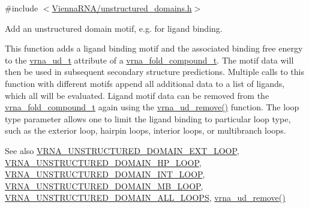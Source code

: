 {\ttfamily \#include $<$\hyperlink{unstructured__domains_8h}{Vienna\+R\+N\+A/unstructured\+\_\+domains.\+h}$>$}



Add an unstructured domain motif, e.\+g. for ligand binding. 

This function adds a ligand binding motif and the associated binding free energy to the \hyperlink{group__domains__up_ga0009117b14d29143e8b18ab891f48c2d}{vrna\+\_\+ud\+\_\+t} attribute of a \hyperlink{group__fold__compound_ga1b0cef17fd40466cef5968eaeeff6166}{vrna\+\_\+fold\+\_\+compound\+\_\+t}. The motif data will then be used in subsequent secondary structure predictions. Multiple calls to this function with different motifs append all additional data to a list of ligands, which all will be evaluated. Ligand motif data can be removed from the \hyperlink{group__fold__compound_ga1b0cef17fd40466cef5968eaeeff6166}{vrna\+\_\+fold\+\_\+compound\+\_\+t} again using the \hyperlink{group__domains__up_gada59cb0c498b812eadd010811af3f2d4}{vrna\+\_\+ud\+\_\+remove()} function. The loop type parameter allows one to limit the ligand binding to particular loop type, such as the exterior loop, hairpin loops, interior loops, or multibranch loops.

\begin{DoxySeeAlso}{See also}
\hyperlink{group__domains__up_gaac911374e86236a51bfd42e1f098eaba}{V\+R\+N\+A\+\_\+\+U\+N\+S\+T\+R\+U\+C\+T\+U\+R\+E\+D\+\_\+\+D\+O\+M\+A\+I\+N\+\_\+\+E\+X\+T\+\_\+\+L\+O\+OP}, \hyperlink{group__domains__up_ga23b610ea9564346c45cc1e2bbb62adf7}{V\+R\+N\+A\+\_\+\+U\+N\+S\+T\+R\+U\+C\+T\+U\+R\+E\+D\+\_\+\+D\+O\+M\+A\+I\+N\+\_\+\+H\+P\+\_\+\+L\+O\+OP}, \hyperlink{group__domains__up_gac4a0feccd9654c149203200248c2716b}{V\+R\+N\+A\+\_\+\+U\+N\+S\+T\+R\+U\+C\+T\+U\+R\+E\+D\+\_\+\+D\+O\+M\+A\+I\+N\+\_\+\+I\+N\+T\+\_\+\+L\+O\+OP}, \hyperlink{group__domains__up_ga67b80796655e5227a4ed662bfbe398b0}{V\+R\+N\+A\+\_\+\+U\+N\+S\+T\+R\+U\+C\+T\+U\+R\+E\+D\+\_\+\+D\+O\+M\+A\+I\+N\+\_\+\+M\+B\+\_\+\+L\+O\+OP}, \hyperlink{group__domains__up_ga3c6be4cce70f1af9e885788856101699}{V\+R\+N\+A\+\_\+\+U\+N\+S\+T\+R\+U\+C\+T\+U\+R\+E\+D\+\_\+\+D\+O\+M\+A\+I\+N\+\_\+\+A\+L\+L\+\_\+\+L\+O\+O\+PS}, \hyperlink{group__domains__up_gada59cb0c498b812eadd010811af3f2d4}{vrna\+\_\+ud\+\_\+remove()}
\end{DoxySeeAlso}

